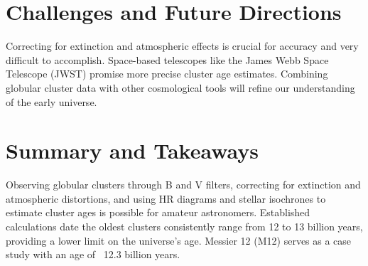 \documentclass[12pt]{article}
\begin{document}
\section{Challenges and Future Directions}
    Correcting for extinction and atmospheric effects is crucial for accuracy and very difficult to accomplish. Space-based telescopes like the James Webb Space Telescope (JWST) promise more precise cluster age estimates. Combining globular cluster data with other cosmological tools will refine our understanding of the early universe.


\section{Summary and Takeaways}
Observing globular clusters through B and V filters, correcting for extinction and atmospheric distortions, and using HR diagrams and stellar isochrones to estimate cluster ages is possible for amateur astronomers. Established calculations date the oldest clusters consistently range from 12 to 13 billion years, providing a lower limit on the universe's age. Messier 12 (M12) serves as a case study with an age of ~12.3 billion years.
\end{document}
